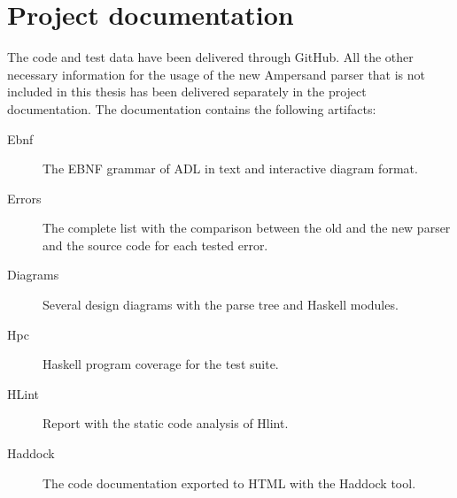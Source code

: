 
\section*{Project documentation}
\label{app:docs}
The code and test data have been delivered through GitHub.
All the other necessary information for the usage of the new Ampersand parser that is not included in this thesis has been delivered separately in the project documentation.
The documentation contains the following artifacts:
\begin{description}
  \item [Ebnf] The EBNF grammar of ADL in text and interactive diagram format.
  \item [Errors] The complete list with the comparison between the old and the new parser and the source code for each tested error.
  \item [Diagrams] Several design diagrams with the parse tree and Haskell modules.
  \item [Hpc] Haskell program coverage for the test suite.
  \item [HLint] Report with the static code analysis of Hlint.
  \item [Haddock] The code documentation exported to HTML with the Haddock tool.
\end{description}
